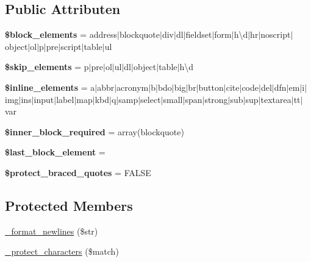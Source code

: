 \subsection*{Public Attributen}
\begin{DoxyCompactItemize}
\item 
\mbox{\label{class_c_i___typography_ac99f5bbe8e02dc1147e9a4205dc161eb}} 
{\bfseries \$block\+\_\+elements} = \textquotesingle{}address$\vert$blockquote$\vert$div$\vert$dl$\vert$fieldset$\vert$form$\vert$h\textbackslash{}d$\vert$hr$\vert$noscript$\vert$object$\vert$ol$\vert$p$\vert$pre$\vert$script$\vert$table$\vert$ul\textquotesingle{}
\item 
\mbox{\label{class_c_i___typography_a80c70a349bff88ad1ef94dea8753bc2e}} 
{\bfseries \$skip\+\_\+elements} = \textquotesingle{}p$\vert$pre$\vert$ol$\vert$ul$\vert$dl$\vert$object$\vert$table$\vert$h\textbackslash{}d\textquotesingle{}
\item 
\mbox{\label{class_c_i___typography_a7ee5f0598125dc7e6b17a08aa6da384f}} 
{\bfseries \$inline\+\_\+elements} = \textquotesingle{}a$\vert$abbr$\vert$acronym$\vert$b$\vert$bdo$\vert$big$\vert$br$\vert$button$\vert$cite$\vert$code$\vert$del$\vert$dfn$\vert$em$\vert$i$\vert$img$\vert$ins$\vert$input$\vert$label$\vert$map$\vert$kbd$\vert$q$\vert$samp$\vert$select$\vert$small$\vert$span$\vert$strong$\vert$sub$\vert$sup$\vert$textarea$\vert$tt$\vert$var\textquotesingle{}
\item 
\mbox{\label{class_c_i___typography_a822eaf22f556c5c52bd766779d9ee22f}} 
{\bfseries \$inner\+\_\+block\+\_\+required} = array(\textquotesingle{}blockquote\textquotesingle{})
\item 
\mbox{\label{class_c_i___typography_a8d5c4b7f2f7b74e118c682cf95688e22}} 
{\bfseries \$last\+\_\+block\+\_\+element} = \textquotesingle{}\textquotesingle{}
\item 
\mbox{\label{class_c_i___typography_a6a74364571da23cc7187c864cde167ca}} 
{\bfseries \$protect\+\_\+braced\+\_\+quotes} = F\+A\+L\+SE
\end{DoxyCompactItemize}
\subsection*{Protected Members}
\begin{DoxyCompactItemize}
\item 
\mbox{\hyperlink{class_c_i___typography_ac3384cbfc88fcd17e40624bdd6002801}{\+\_\+format\+\_\+newlines}} (\$str)
\item 
\mbox{\hyperlink{class_c_i___typography_a03e8f97de4301e0fe0cf0e9f0bcd936c}{\+\_\+protect\+\_\+characters}} (\$match)
\end{DoxyCompactItemize}


